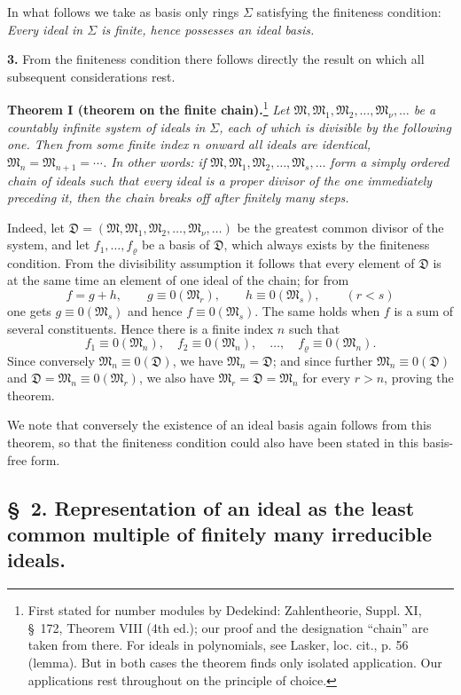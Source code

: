 \documentclass[11pt]{article}
\newcommand{\ideal}[1]{\mathfrak{#1}}
\begin{document}
In what follows we take as basis only rings $\Sigma$ satisfying the finiteness condition: \emph{Every ideal in $\Sigma$ is finite, hence possesses an ideal basis.}

\textbf{3.} From the finiteness condition there follows directly the result on which all subsequent considerations rest.

\textbf{Theorem I (theorem on the finite chain).}\footnote{First stated for number modules by Dedekind: Zahlentheorie, Suppl. XI, \S~172, Theorem VIII (4th ed.); our proof and the designation ``chain'' are taken from there. For ideals in polynomials, see Lasker, loc. cit., p. 56 (lemma). But in both cases the theorem finds only isolated application. Our applications rest throughout on the principle of choice.} \emph{Let $\ideal M,\ideal M_1,\ideal M_2,\ldots,\ideal M_\nu,\ldots$ be a countably infinite system of ideals in $\Sigma$, each of which is divisible by the following one. Then from some finite index $n$ onward all ideals are identical, $\ideal M_n=\ideal M_{n+1}=\cdots$. In other words: if $\ideal M,\ideal M_1,\ideal M_2,\ldots,\ideal M_s,
\ldots$ form a simply ordered chain of ideals such that every ideal is a proper divisor of the one immediately preceding it, then the chain breaks off after finitely many steps.}

Indeed, let $\ideal D=(\ideal M,\ideal M_1,\ideal M_2,\ldots,\ideal M_\nu,\ldots)$ be the greatest common divisor of the system, and let $f_1,\ldots,f_\varrho$ be a basis of $\ideal D$, which always exists by the finiteness condition. From the divisibility assumption it follows that every element of $\ideal D$ is at the same time an element of one ideal of the chain; for from
\[
 f=g+h,\qquad g\equiv0(\ideal M_r),\qquad h\equiv0(\ideal M_s),\qquad (r<s)
\]
one gets $g\equiv0(\ideal M_s)$ and hence $f\equiv0(\ideal M_s)$. The same holds when $f$ is a sum of several constituents. Hence there is a finite index $n$ such that
\[
 f_1\equiv0(\ideal M_n),\quad f_2\equiv0(\ideal M_n),\quad\ldots,\quad f_\varrho\equiv0(\ideal M_n).
\]
Since conversely $\ideal M_n\equiv0(\ideal D)$, we have $\ideal M_n=\ideal D$; and since further $\ideal M_n\equiv0(\ideal D)$ and $\ideal D=\ideal M_n\equiv0(\ideal M_r)$, we also have $\ideal M_r=\ideal D=\ideal M_n$ for every $r>n$, proving the theorem.

We note that conversely the existence of an ideal basis again follows from this theorem, so that the finiteness condition could also have been stated in this basis-free form.

\subsection*{\S~2. Representation of an ideal as the least common multiple of finitely many irreducible ideals.}
\end{document}
